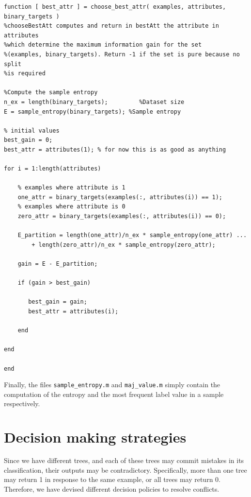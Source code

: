 \documentclass{article}
\begin{document}
\begin{lstlisting}
function [ best_attr ] = choose_best_attr( examples, attributes, binary_targets )
%chooseBestAtt computes and return in bestAtt the attribute in attributes
%which determine the maximum information gain for the set 
%(examples, binary_targets). Return -1 if the set is pure because no split
%is required

%Compute the sample entropy
n_ex = length(binary_targets);         %Dataset size
E = sample_entropy(binary_targets); %Sample entropy

% initial values
best_gain = 0;
best_attr = attributes(1); % for now this is as good as anything
    
for i = 1:length(attributes)
       
    % examples where attribute is 1
    one_attr = binary_targets(examples(:, attributes(i)) == 1); 
    % examples where attribute is 0
    zero_attr = binary_targets(examples(:, attributes(i)) == 0);
        
    E_partition = length(one_attr)/n_ex * sample_entropy(one_attr) ...
        + length(zero_attr)/n_ex * sample_entropy(zero_attr);
        
    gain = E - E_partition;
        
    if (gain > best_gain)
            
       best_gain = gain;
       best_attr = attributes(i);
        
    end
        
end

end

\end{lstlisting}
Finally, the files \verb$sample_entropy.m$ and \verb$maj_value.m$ simply contain the computation of the entropy and the most frequent label value in a sample respectively.

\section{Decision making strategies}
\label{sec:decision_strategies}
Since we have different trees, and each of these trees may commit mistakes in its classification, their outputs may be contradictory. Specifically, more than one tree may return 1 in response to the same example, or all trees may return 0. Therefore, we have devised different decision policies to resolve conflicts.
\end{document}
